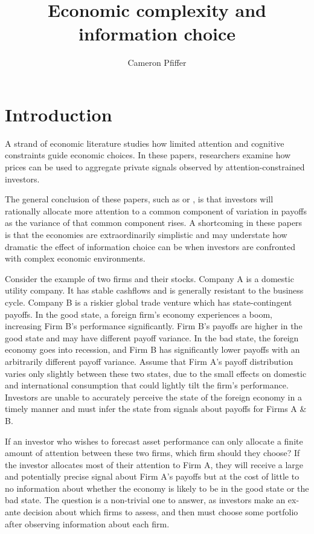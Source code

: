 \documentclass{article}
\title{Economic complexity and information choice}
\author{Cameron Pfiffer}
\begin{document}
\newcommand{\Gauss}{\mathcal{N}}
\newcommand{\Var}{\text{Var}}
\newcommand{\E}{\text{E}}
\newcommand{\argmax}{\text{argmax}}

\newtheorem{definition}{Definition}


\newpage

\maketitle

\section{Introduction}

A strand of economic literature studies how limited attention and cognitive constraints guide economic choices. In these papers, researchers examine how prices can be used to aggregate private signals observed by attention-constrained investors. 

The general conclusion of these papers, such as \textcite{kacperczyk_rational_2016} or \textcite{peng_investor_2006}, is that investors will rationally allocate more attention to a common component of variation in payoffs as the variance of that common component rises. A shortcoming in these papers is that the economies are extraordinarily simplistic and may understate how dramatic the effect of information choice can be when investors are confronted with complex economic environments.

Consider the example of two firms and their stocks. Company A is a domestic utility company. It has stable cashflows and is generally resistant to the business cycle. Company B is a riskier global trade venture which has state-contingent payoffs. In the good state, a foreign firm's economy experiences a boom, increasing Firm B's performance significantly. Firm B's payoffs are higher in the good state and may have different payoff variance. In the bad state, the foreign economy goes into recession, and Firm B has significantly lower payoffs with an arbitrarily different payoff variance. Assume that Firm A's payoff distribution varies only slightly between these two states, due to the small effects on domestic and international consumption that could lightly tilt the firm's performance. Investors are unable to accurately perceive the state of the foreign economy in a timely manner and must infer the state from signals about payoffs for Firms A \& B.

If an investor who wishes to forecast asset performance can only allocate a finite amount of attention between these two firms, which firm should they choose? If the investor allocates most of their attention to Firm A, they will receive a large and potentially precise signal about Firm A's payoffs but at the cost of little to no information about whether the economy is likely to be in the good state or the bad state. The question is a non-trivial one to answer, as investors make an ex-ante decision about which firms to assess, and then must choose some portfolio after observing information about each firm.
\end{document}

